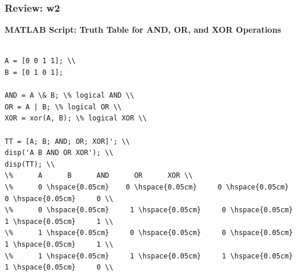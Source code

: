 \documentclass[
	11pt, %
]{beamer}
\begin{document}

\begin{frame}
	\frametitle{Review: w2}
\textbf{MATLAB Script: Truth Table for AND, OR, and XOR Operations}

\begin{verbatim}

A = [0 0 1 1]; \\
B = [0 1 0 1];

AND = A \& B; \% logical AND \\
OR = A | B; \% logical OR \\
XOR = xor(A, B); \% logical XOR \\

TT = [A; B; AND; OR; XOR]'; \\
disp('A B AND OR XOR'); \\
disp(TT); \\
\%      A      B      AND      OR      XOR \\
\%      0 \hspace{0.05cm}    0 \hspace{0.05cm}     0 \hspace{0.05cm}     0 \hspace{0.05cm}     0 \\
\%      0 \hspace{0.05cm}     1 \hspace{0.05cm}     0 \hspace{0.05cm}     1 \hspace{0.05cm}     1 \\
\%      1 \hspace{0.05cm}     0 \hspace{0.05cm}     0 \hspace{0.05cm}     1 \hspace{0.05cm}     1 \\
\%      1 \hspace{0.05cm}     1 \hspace{0.05cm}     1 \hspace{0.05cm}     1 \hspace{0.05cm}     0 \\
\end{verbatim}
\end{frame}
\end{document}
